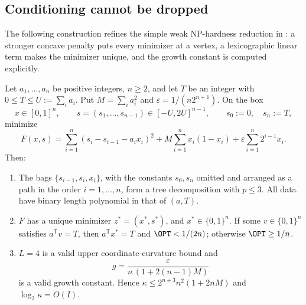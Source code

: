 \subsection{Conditioning cannot be dropped}\label{sec:limits-conditioning}

The following construction refines the simple weak NP-hardness reduction
in \cite[Remark~2]{DelPiaKhajavirad2026}: a stronger concave penalty puts
every minimizer at a vertex, a lexicographic linear term makes the minimizer
unique, and the growth constant is computed explicitly.

\begin{proposition}\label{lim:prop:unique}
Let $a_1,\ldots,a_n$ be positive integers, $n\ge2$, and let $T$ be an
integer with $0\le T\le U:=\sum_ia_i$. Put $M=\sum_ia_i^2$ and
$\varepsilon=1/(n2^{n+1})$. On the box
\[
x\in[0,1]^n,\qquad s=(s_1,\ldots,s_{n-1})\in[-U,2U]^{n-1},
\qquad s_0:=0,\quad s_n:=T,
\]
minimize
\[
F(x,s)=\sum_{i=1}^n(s_i-s_{i-1}-a_ix_i)^2
+M\sum_{i=1}^nx_i(1-x_i)+\varepsilon\sum_{i=1}^n2^{i-1}x_i .
\]
Then:
\begin{enumerate}
\item The bags $\{s_{i-1},s_i,x_i\}$, with the constants $s_0,s_n$ omitted
  and arranged as a path in the order $i=1,\ldots,n$, form a tree
  decomposition with $p\le3$. All data have binary length polynomial in
  that of $(a,T)$.
\item $F$ has a unique minimizer $z^*=(x^*,s^*)$, and $x^*\in\{0,1\}^n$.
  If some $v\in\{0,1\}^n$ satisfies $a^{\mathsf T}v=T$, then
  $a^{\mathsf T}x^*=T$ and $\OPT<1/(2n)$; otherwise $\OPT\ge1/n$.
\item $L=4$ is a valid upper coordinate-curvature bound and
  \[
  g=\frac{\varepsilon}{n\,(1+2(n-1)M)}
  \]
  is a valid growth constant. Hence
  $\kappa\le2^{n+3}n^2(1+2nM)$ and $\log_2\kappa=O(I)$.
\end{enumerate}
\end{proposition}

